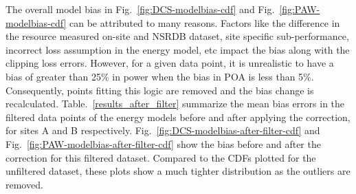 \documentclass[conference]{IEEEtran}
\begin{document}
The overall model bias in Fig.~\ref{fig:DCS-modelbias-cdf} and Fig.~\ref{fig:PAW-modelbias-cdf} can be attributed to many reasons. Factors like the difference in the resource measured on-site and NSRDB dataset, site specific sub-performance, incorrect loss assumption in the energy model, etc impact the bias along with the clipping loss errors. However, for a given data point, it is unrealistic to have a bias of greater than 25\% in power when the bias in POA is less than 5\%. Consequently, points fitting this logic are removed and the bias change is recalculated. Table.~\ref{results_after_filter} summarize the mean bias errors in the filtered data points of the energy models before and after applying the correction, for sites A and B respectively. Fig.~\ref{fig:DCS-modelbias-after-filter-cdf} and Fig.~\ref{fig:PAW-modelbias-after-filter-cdf} show the bias before and after the correction for this filtered dataset. Compared to the CDFs plotted for the unfiltered dataset, these plots show a much tighter distribution as the outliers are removed. 

\begin{table}[htbp]
\caption{Results summary by Site, after filtering}
\begin{center}
\end{center}
\label{results_after_filter}
\end{table}
\end{document}
